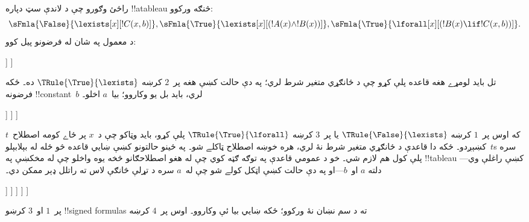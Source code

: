 \documentclass[../../../include/open-logic-section]{subfiles}
\begin{document}
\begin{ex}
راځئ وګورو چې د لاندې سټ دپاره !!a{tableau} څنګه ورکوو:
\[
\sFmla{\False}{\lexists[x][!C(x,b)]},
\sFmla{\True}{\lexists[x][(!A(x) \land !B(x))]},
\sFmla{\True}{\lforall[x][(!B(x) \lif !C(x,b))]}.
\]
د معمول په شان له فرضونو پيل کوو:
\begin{oltableau}
  [\sFmla{\False}{\lexists[x][\formula{C}(x,b)]}, just=\TAss
    [\sFmla{\True}{\lexists[x][(\formula{A}(x) \land \formula{B}(x))]},
      just=\TAss
      [\sFmla{\True}{\lforall[x][(\formula{B}(x) \lif \formula{C}(x,b))]},
        just=\TAss]
    ]
  ]
\end{oltableau}
تل بايد لومړے هغه قاعده پلې کړو چې د ځانګړي متغير شرط لري؛ په
دې حالت کښې هغه پر~$2$ کرښه $\TRule{\True}{\lexists}$ ده۔ ځکه
فرضونه !!{constant}~$b$ لري، بايد بل يو وکاروو؛ بيا~$a$ اخلو۔
\begin{oltableau}
  [\sFmla{\False}{\lexists[x][\formula{C}(x,b)]}, just=\TAss
    [\sFmla{\True}{\lexists[x][(\formula{A}(x) \land \formula{B}(x))]},
      just=\TAss, checked
      [\sFmla{\True}{\lforall[x][(\formula{B}(x) \lif \formula{C}(x,b))]},
        just=\TAss
        [\sFmla{\True}{\formula{A}(a) \land \formula{B}(a)},
          just={\TRule{\True}{\lexists}[2]}]
      ]
    ]
  ]
\end{oltableau}
که اوس پر~$1$ کرښه $\TRule{\False}{\lexists}$ يا پر~$3$ کرښه
$\TRule{\True}{\lforall}$ پلې کړو، بايد وټاکو چې د~$x$ پر ځاے
کومه اصطلاح~$t$ کښېږدو۔ ځکه دا قاعدې د ځانګړي متغير شرط نۀ لري،
هره خوښه اصطلاح ټاکلے شو۔ په ځينو حالتونو کښې ښايي قاعده څو ځله
له بېلابېلو~$t$s سره پلې کول هم لازم شي۔ خو د عمومي قاعدې په توګه
ګټه کوي چې له هغو اصطلاحګانو څخه يوه واخلو چې له مخکښې په
!!{tableau} کښې راغلې وي---دلته $a$ او~$b$---او په دې حالت کښې
اټکل کولے شو چې له~$a$ سره د تړلې څانګې لاس ته راتلل ډېر ممکن دي۔
\begin{oltableau}
  [\sFmla{\False}{\lexists[x][\formula{C}(x,b)]}, just=\TAss
    [\sFmla{\True}{\lexists[x][(\formula{A}(x) \land \formula{B}(x))]},
      just=\TAss, checked
      [\sFmla{\True}{\lforall[x][(\formula{B}(x) \lif \formula{C}(x,b))]}, just=\TAss
        [\sFmla{\True}{\formula{A}(a) \land \formula{B}(a)}, just={\TRule{\True}{\lexists}[2]}
          [\sFmla{\False}{\formula{C}(a,b)}, just={\TRule{\False}{\lexists}[1]}
            [\sFmla{\True}{\formula{B}(a) \lif \formula{C}(a,b)},
              just={\TRule{\True}{\lforall}[3]}
            ]
          ]
        ]
      ]
    ]
  ]
\end{oltableau}
پر~$1$ او~$3$ کرښو !!{signed formula}s ته د سم نښان نۀ ورکوو؛
ځکه ښايي بيا ئې وکاروو۔ اوس پر~$4$ کرښه

\end{ex}
\end{document}
